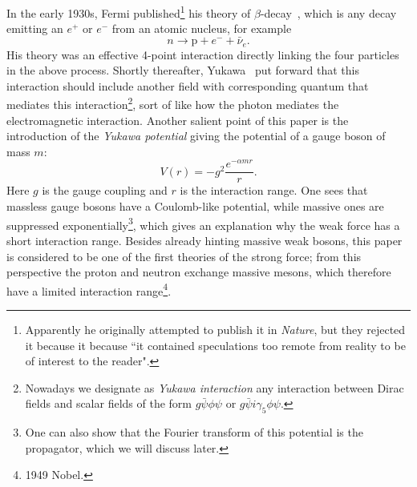 In the early 1930s, Fermi published\footnote{Apparently he originally attempted
to publish it in {\it Nature}, but they rejected it because
it because ``it contained speculations too remote from reality to be of interest
to the reader".} his theory of $\beta$-decay~\cite{fermi_tentativo_1934},
 which is any decay emitting an $e^+$ or $e^-$ from
an atomic nucleus, for example
\begin{equation}
  n\to\text{p}+e^-+\bar{\nu}_e.
\end{equation}
His theory was an effective 4-point interaction directly linking the four
particles in the above process.
Shortly thereafter, Yukawa~\cite{yukawa_interaction_1935} put forward that this
interaction should include another field with corresponding quantum that
mediates this interaction\footnote{Nowadays we designate as
{\it Yukawa interaction} any interaction between
Dirac fields and scalar fields of the form
$g\bar{\psi}\phi\psi$ or $g\bar{\psi}i\gamma_5\phi\psi$.}, 
sort of like how the photon mediates the
electromagnetic interaction. Another salient point of this paper is
the introduction of the {\it Yukawa potential}
giving the potential of a gauge boson of mass $m$:
\begin{equation}
  V(r)=-g^2\frac{e^{-\alpha m r}}{r}.
\end{equation}
Here $g$ is the gauge coupling and $r$ is the interaction range. One sees that
massless gauge bosons have a Coulomb-like potential, while massive ones
are suppressed exponentially\footnote{One can also show that the Fourier
transform of this potential is the propagator, which we will discuss later.},
which gives an explanation why the weak force has a short interaction range. 
Besides already hinting massive weak bosons, this paper is considered to be
one of the first theories of the strong force; from this perspective the
proton and neutron exchange massive mesons, which therefore have a limited
interaction range\footnote{1949 Nobel.}.

